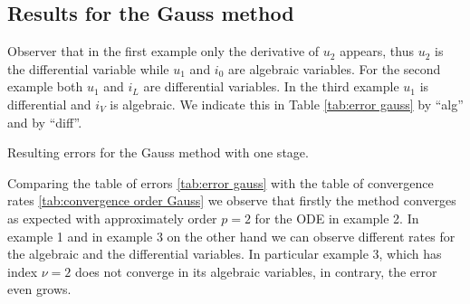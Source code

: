 \subsection{Results for the Gauss method}

	Observer that in the first example only the derivative of $u_2$ appears, thus $u_2$ is the differential variable while $u_1$ and $i_0$ are algebraic variables. For the second example both $u_1$ and $i_L$ are differential variables. In the third example $u_1$ is differential and $i_V$ is algebraic. We indicate this in Table \ref{tab:error gauss} by ``alg'' and by ``diff''.
	
	\begin{table}[H]
		\caption{Resulting errors for the Gauss method with one stage.}
		\label{tab:error gauss}
	\end{table}
	
	Comparing the table of errors \ref{tab:error gauss} with the table of convergence rates \ref{tab:convergence order Gauss} we observe that firstly the method converges as expected with approximately order $p=2$ for the ODE in example 2. In example 1 and in example 3 on the other hand we can observe different rates for the algebraic and the differential variables. In particular example 3, which has index $\nu = 2$ does not converge in its algebraic variables, in contrary, the error even grows.
